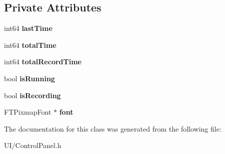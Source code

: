 \subsection*{Private Attributes}
\begin{DoxyCompactItemize}
\item 
\hypertarget{classClock_a0ecae9f058bf404f8ba4c751059b09fb}{int64 {\bfseries last\-Time}}\label{classClock_a0ecae9f058bf404f8ba4c751059b09fb}

\item 
\hypertarget{classClock_afd4051e376096ad507ef6a23b5bb3883}{int64 {\bfseries total\-Time}}\label{classClock_afd4051e376096ad507ef6a23b5bb3883}

\item 
\hypertarget{classClock_ab752e7fc167a349669c7c023f8b2283c}{int64 {\bfseries total\-Record\-Time}}\label{classClock_ab752e7fc167a349669c7c023f8b2283c}

\item 
\hypertarget{classClock_aea23ad4073ac778ee5f9730f1790af77}{bool {\bfseries is\-Running}}\label{classClock_aea23ad4073ac778ee5f9730f1790af77}

\item 
\hypertarget{classClock_ad5e843ef01ea3c5935f34c5e300b58ce}{bool {\bfseries is\-Recording}}\label{classClock_ad5e843ef01ea3c5935f34c5e300b58ce}

\item 
\hypertarget{classClock_ac065e00d83c1e3b667fab9301ed471a6}{F\-T\-Pixmap\-Font $\ast$ {\bfseries font}}\label{classClock_ac065e00d83c1e3b667fab9301ed471a6}

\end{DoxyCompactItemize}


The documentation for this class was generated from the following file\-:\begin{DoxyCompactItemize}
\item 
U\-I/Control\-Panel.\-h\end{DoxyCompactItemize}
